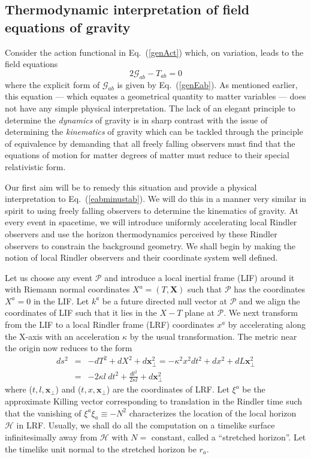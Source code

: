 \documentclass[12pt]{iopart}
\def\eq#1{{Eq.~(\ref{#1})}}
\begin{document}
\subsection{Thermodynamic interpretation of field equations of gravity}\label{sec:interpretthermo}


Consider the action functional in \eq{genAct} which, on variation, leads to the field equations 
\begin{equation}
2\mathcal{G}_{ab} -   T_{ab}=0
\label{eabminustab}
\end{equation} 
where the explicit form of $\mathcal{G}_{ab}$ is given by \eq{genEab}. 
As mentioned earlier,  this 
equation --- which equates   a geometrical quantity to matter variables ---
does not have any simple physical interpretation. 
The lack of an elegant principle to determine the \textit{dynamics} of gravity
is in sharp contrast with the issue of determining the \textit{kinematics}
of gravity which  can be tackled through the principle of equivalence by demanding that all freely falling observers  must find that the equations of motion for matter degrees of matter must reduce to their special relativistic form. 


Our first aim will be to remedy this situation and provide a physical interpretation to 
\eq{eabminustab}. We will do this in a manner very similar in spirit to using freely falling observers to determine the kinematics of gravity. At every event in spacetime, we will introduce uniformly accelerating local Rindler observers and use the horizon thermodynamics
perceived by these Rindler observers to constrain the background geometry.
 We shall begin by making the notion of local Rindler observers and their coordinate system well defined. 
 
 
 Let us choose any event $\mathcal{P}$ and introduce a local inertial frame (LIF) around it with Riemann normal coordinates $X^a=(T,\mathbf {X})$ such that $\mathcal{P}$ has the coordinates $X^a=0$ in the LIF.  
Let $k^a$  be
 a future directed null vector at $\mathcal{P}$ and we align the coordinates of LIF
 such that it lies in the $X-T$ plane at $\mathcal{P}$. We next  transform from the LIF to a local Rindler frame (LRF) coordinates $x^a$ by accelerating along the X-axis with an acceleration $\kappa$ by the usual transformation. The metric near the origin now reduces to the form  
 \begin{eqnarray}
 ds^2 &=& -dT^2 + dX^2 + d\mathbf{x}_\perp^2=-\kappa^2 x^2 dt^2 + dx^2 + dL\mathbf{x}_\perp^2\nonumber\\
&=& - 2 \kappa l \ dt^2 + \frac{dl^2}{2\kappa l}  + d\mathbf{x}_\perp^2
\label{surfrind}
\end{eqnarray} 
where  ($t,l, \mathbf {x}_\perp$) and ($t,x, \mathbf {x}_\perp$) 
are the coordinates of LRF.  
 Let $\xi^a$ be the approximate Killing vector corresponding to translation in the Rindler time such
that the vanishing of $\xi^a\xi_a \equiv -N^2$ characterizes the location of the 
local horizon $\mathcal{H}$ in LRF. Usually, we shall do all the computation 
on a timelike surface infinitesimally away from $\mathcal{H}$
with $N=$ constant,  called a  ``stretched horizon''. 
 Let the timelike unit normal to the stretched horizon
be  $r_a$. 
\end{document}
